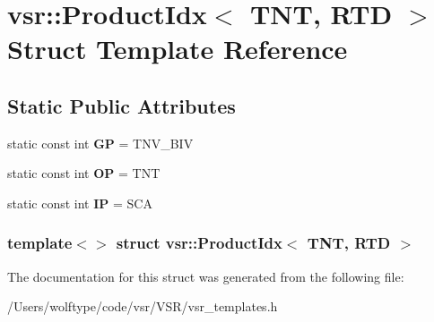 \hypertarget{structvsr_1_1_product_idx_3_01_t_n_t_00_01_r_t_d_01_4}{\section{vsr\-:\-:Product\-Idx$<$ T\-N\-T, R\-T\-D $>$ Struct Template Reference}
\label{structvsr_1_1_product_idx_3_01_t_n_t_00_01_r_t_d_01_4}
}
\subsection*{Static Public Attributes}
\begin{DoxyCompactItemize}
\item 
\hypertarget{structvsr_1_1_product_idx_3_01_t_n_t_00_01_r_t_d_01_4_a56e7718c30fb29d2f6faa7f1688ed1d8}{static const int {\bfseries G\-P} = T\-N\-V\-\_\-\-B\-I\-V}\label{structvsr_1_1_product_idx_3_01_t_n_t_00_01_r_t_d_01_4_a56e7718c30fb29d2f6faa7f1688ed1d8}

\item 
\hypertarget{structvsr_1_1_product_idx_3_01_t_n_t_00_01_r_t_d_01_4_abad3ffb44c94261f492146f638f76fcf}{static const int {\bfseries O\-P} = T\-N\-T}\label{structvsr_1_1_product_idx_3_01_t_n_t_00_01_r_t_d_01_4_abad3ffb44c94261f492146f638f76fcf}

\item 
\hypertarget{structvsr_1_1_product_idx_3_01_t_n_t_00_01_r_t_d_01_4_a3140313af2035cf9a59fc4a6c97221b9}{static const int {\bfseries I\-P} = S\-C\-A}\label{structvsr_1_1_product_idx_3_01_t_n_t_00_01_r_t_d_01_4_a3140313af2035cf9a59fc4a6c97221b9}

\end{DoxyCompactItemize}
\subsubsection*{template$<$$>$ struct vsr\-::\-Product\-Idx$<$ T\-N\-T, R\-T\-D $>$}



The documentation for this struct was generated from the following file\-:\begin{DoxyCompactItemize}
\item 
/\-Users/wolftype/code/vsr/\-V\-S\-R/vsr\-\_\-templates.\-h\end{DoxyCompactItemize}
